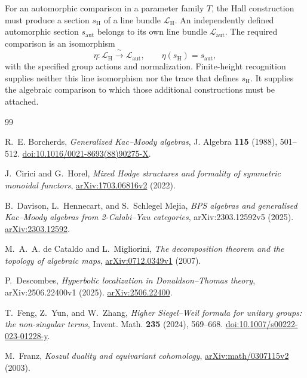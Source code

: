 \documentclass[11pt]{article}
\begin{document}
For an automorphic comparison in a parameter family $T$, the Hall
construction must produce a section $s_{\mathrm H}$ of a line bundle
$\mathcal L_{\mathrm H}$.
An independently defined automorphic section $s_{\mathrm{aut}}$
belongs to its own line bundle $\mathcal L_{\mathrm{aut}}$.
The required comparison is an isomorphism
\[
 \eta:\mathcal L_{\mathrm H}\xrightarrow{\ \sim\ }
       \mathcal L_{\mathrm{aut}},
 \qquad \eta(s_{\mathrm H})=s_{\mathrm{aut}},
\]
with the specified group actions and normalization.
Finite-height recognition supplies neither this line isomorphism nor
the trace that defines $s_{\mathrm H}$.
It supplies the algebraic comparison to which those additional
constructions must be attached.

\begin{thebibliography}{99}

R.~E. Borcherds,
\emph{Generalized Kac--Moody algebras},
J. Algebra \textbf{115} (1988), 501--512.
\href{https://doi.org/10.1016/0021-8693(88)90275-X}
{doi:10.1016/0021-8693(88)90275-X}.

J.~Cirici and G.~Horel,
\emph{Mixed Hodge structures and formality of symmetric monoidal
functors},
\href{https://arxiv.org/abs/1703.06816v2}
{arXiv:1703.06816v2} (2022).

B.~Davison, L.~Hennecart, and S.~Schlegel Mejia,
\emph{BPS algebras and generalised Kac--Moody algebras from
2-Calabi--Yau categories},
arXiv:2303.12592v5 (2025).
\href{https://arxiv.org/abs/2303.12592}
{arXiv:2303.12592}.

M.~A.~A. de Cataldo and L.~Migliorini,
\emph{The decomposition theorem and the topology of algebraic maps},
\href{https://arxiv.org/abs/0712.0349v1}
{arXiv:0712.0349v1} (2007).

P.~Descombes,
\emph{Hyperbolic localization in Donaldson--Thomas theory},
arXiv:2506.22400v1 (2025).
\href{https://arxiv.org/abs/2506.22400}
{arXiv:2506.22400}.

T.~Feng, Z.~Yun, and W.~Zhang,
\emph{Higher Siegel--Weil formula for unitary groups:
the non-singular terms},
Invent. Math. \textbf{235} (2024), 569--668.
\href{https://doi.org/10.1007/s00222-023-01228-y}
{doi:10.1007/s00222-023-01228-y}.

M.~Franz,
\emph{Koszul duality and equivariant cohomology},
\href{https://arxiv.org/abs/math/0307115v2}
{arXiv:math/0307115v2} (2003).


\end{thebibliography}
\end{document}
